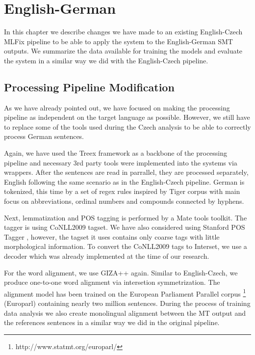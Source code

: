 \chapter{English-German}
\label{chap:german}

In this chapter we describe changes we have made to an existing
English-Czech MLFix pipeline to be able to apply the system to the English-German
SMT outputs. We summarize the data available for training the models
and evaluate the system in a similar way we did with the English-Czech
pipeline.

\section{Processing Pipeline Modification}

As we have already pointed out, we have focused on making the processing pipeline as independent
on the target language as possible. However, we still have to replace some of the tools
used during the Czech analysis to be able to correctly process German sentences.

Again, we have used the Treex framework as a backbone of the processing pipeline and
necessary 3rd party tools were implemented into the systems via wrappers.
After the sentences are read in parrallel, they are processed separately, English
following the same scenario as in the English-Czech pipeline.
German is tokenized, this time by a set of regex rules inspired by Tiger corpus \citep{Brants2004}
with main focus on abbreviations, ordinal numbers and compounds connected by hyphens.

Next, lemmatization and POS tagging is performed by a Mate tools
toolkit. The tagger is using CoNLL2009 \citep{CoNLL-2009-ST} tagset. We have also considered using
Stanford POS Tagger \citep{Toutanova:2000:EKS:1117794.1117802},
however, the tagset it uses contains only coarse tags with little morphological information.
To convert the CoNLL2009 tags to Interset, we use a decoder which was already implemented at the
time of our research.

For the word alignment, we use GIZA++ again. Similar to English-Czech, we produce one-to-one word alignment
via intersetion symmetrization. The alignment model has been trained on the European
Parliament Parallel corpus \citep{koehn2005epc}\footnote{http://www.statmt.org/europarl/} (Europarl)
containing nearly two million sentences. During the process of training data analysis we 
also create monolingual alignment between the MT output and the references sentences
in a similar way we did in the original pipeline.

